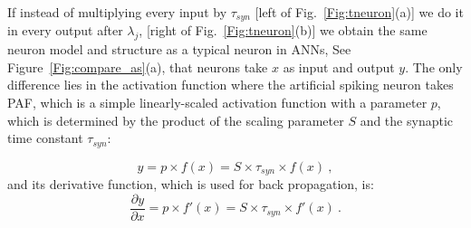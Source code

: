 \documentclass{article}
\begin{document}
	If instead of multiplying every input by $\tau_{syn}$ [left of Fig.~\ref{Fig:tneuron}(a)] we do it in every output after $\lambda_j$, [right of Fig.~\ref{Fig:tneuron}(b)] we obtain the same neuron model and structure as a typical neuron in ANNs, See Figure~\ref{Fig:compare_as}(a), that neurons take $x$ as input and output $y$.
	The only difference lies in the activation function where the artificial spiking neuron takes PAF, which is a simple linearly-scaled activation function with a parameter $p$, which is determined by the product of the scaling parameter $S$ and the synaptic time constant $\tau_{syn}$:

\begin{equation}
	y = p \times f(x) = S \times \tau_{syn} \times f(x)~,
	\label{equ:PAF}
	\end{equation}
	and its derivative function, which is used for back propagation, is:
	\begin{equation}
	\frac{\partial y}{\partial x} = p \times f'(x) = S \times \tau_{syn} \times f'(x)~.
	\end{equation}
	
\end{document}
